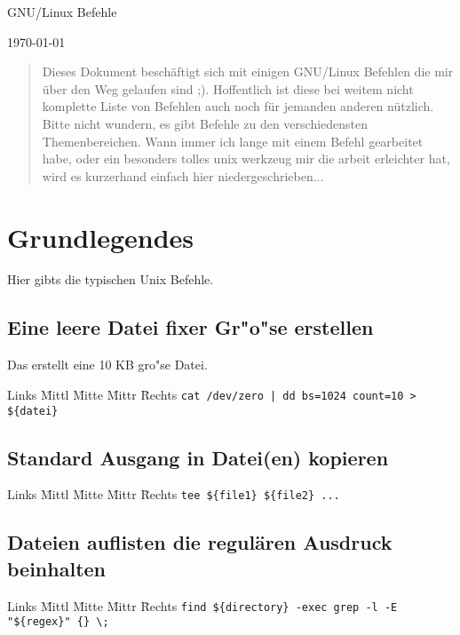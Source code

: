\documentclass[12pt]{article}
\newenvironment{code}{\begin{tabbing}Links \= Mittl \= Mitte \= Mittr \= Rechts \kill}{\end{tabbing}}
\begin{document}
\pagestyle{empty}

\label{cover_page}

\begin{center}
	\huge{GNU/Linux Befehle\\}
\end{center}

\begin{center}
	\today
\end{center}

\begin{abstract}
	\label{the_abstract}
	Dieses Dokument beschäftigt sich mit einigen GNU/Linux Befehlen die
	mir über den Weg gelaufen sind ;). Hoffentlich ist diese bei weitem nicht 
	komplette Liste von Befehlen auch noch für jemanden anderen nützlich.
	Bitte nicht wundern, es gibt Befehle zu den verschiedensten Themenbereichen. Wann immer
	ich lange mit einem Befehl gearbeitet habe, oder ein besonders tolles unix werkzeug mir
	die arbeit erleichter hat, wird es kurzerhand einfach hier niedergeschrieben...
\end{abstract}
\newpage

\tableofcontents

\newpage
\section{Grundlegendes}
Hier gibts die typischen Unix Befehle.
\subsection{Eine leere Datei fixer Gr"o"se erstellen}
Das erstellt eine 10 KB gro"se Datei.
\begin{code}
	\> \verb#cat /dev/zero | dd bs=1024 count=10 > ${datei}#
\end{code}
\subsection{Standard Ausgang in Datei(en) kopieren}
\begin{code}
	\> \verb#tee ${file1} ${file2} ...#
\end{code}
\subsection{Dateien auflisten die regulären Ausdruck beinhalten}
\begin{code}
	\> \verb#find ${directory} -exec grep -l -E "${regex}" {} \;#
\end{code}
\end{document}
